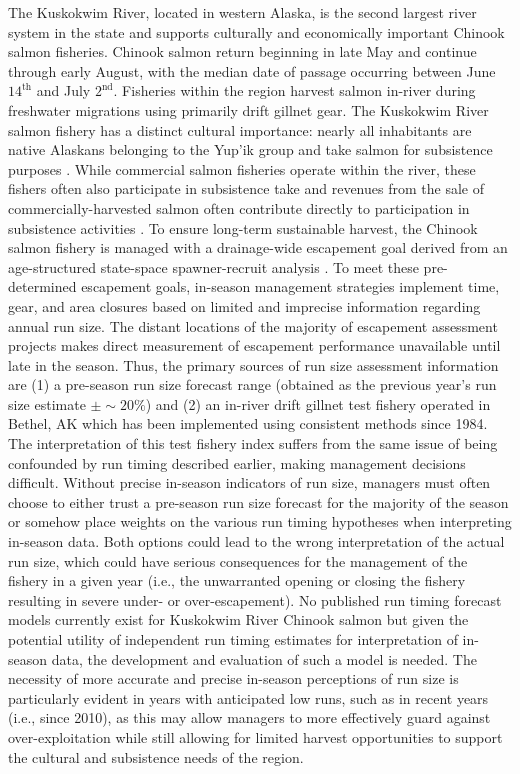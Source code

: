 \documentclass[12pt,]{book}
\theoremstyle{definition}
\theoremstyle{definition}
\theoremstyle{definition}
\theoremstyle{remark}
\begin{document}
The Kuskokwim River, located in western Alaska, is the second largest
river system in the state and supports culturally and economically
important Chinook salmon fisheries. Chinook salmon return beginning in
late May and continue through early August, with the median date of
passage occurring between June \(14^{\text{th}}\) and July
\(2^{\text{nd}}\). Fisheries within the region harvest salmon in-river
during freshwater migrations using primarily drift gillnet gear. The
Kuskokwim River salmon fishery has a distinct cultural importance:
nearly all inhabitants are native Alaskans belonging to the Yup'ik group
and take salmon for subsistence purposes
\citep{linderman-bergstrom-2009}. While commercial salmon fisheries
operate within the river, these fishers often also participate in
subsistence take and revenues from the sale of commercially-harvested
salmon often contribute directly to participation in subsistence
activities \citep{wolfe-spaeder-2009}. To ensure long-term sustainable
harvest, the Chinook salmon fishery is managed with a drainage-wide
escapement goal derived from an age-structured state-space
spawner-recruit analysis \citep{hamazaki-etal-2012, staton-etal-2017a}.
To meet these pre-determined escapement goals, in-season management
strategies implement time, gear, and area closures based on limited and
imprecise information regarding annual run size. The distant locations
of the majority of escapement assessment projects makes direct
measurement of escapement performance unavailable until late in the
season. Thus, the primary sources of run size assessment information are
(1) a pre-season run size forecast range (obtained as the previous
year's run size estimate \(\pm \sim 20\%\)) and (2) an in-river drift
gillnet test fishery operated in Bethel, AK which has been implemented
using consistent methods since 1984. The interpretation of this test
fishery index suffers from the same issue of being confounded by run
timing described earlier, making management decisions difficult. Without
precise in-season indicators of run size, managers must often choose to
either trust a pre-season run size forecast for the majority of the
season or somehow place weights on the various run timing hypotheses
when interpreting in-season data. Both options could lead to the wrong
interpretation of the actual run size, which could have serious
consequences for the management of the fishery in a given year (i.e.,
the unwarranted opening or closing the fishery resulting in severe
under- or over-escapement). No published run timing forecast models
currently exist for Kuskokwim River Chinook salmon but given the
potential utility of independent run timing estimates for interpretation
of in-season data, the development and evaluation of such a model is
needed. The necessity of more accurate and precise in-season perceptions
of run size is particularly evident in years with anticipated low runs,
such as in recent years (i.e., since 2010), as this may allow managers
to more effectively guard against over-exploitation while still allowing
for limited harvest opportunities to support the cultural and
subsistence needs of the region.
\end{document}
